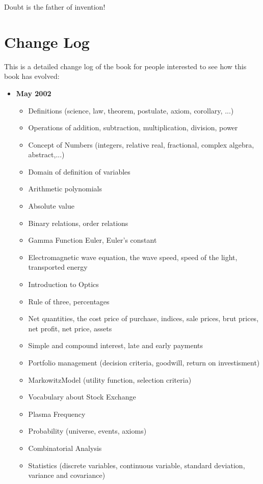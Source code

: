 \documentclass[12pt,a4paper,twoside,openright]{report}
\newcounter{def}
\theoremstyle{definition}
\theoremstyle{itexmp}
\numberwithin{equation}{section}
\begin{document}
 	\begin{fquote}Doubt is the father of invention!
 	\end{fquote}

\chapter{Change Log}

This is a detailed change log of the book for people interested to see how this book has evolved:

	\begin{itemize}
		\item \textbf{May 2002}
		\begin{itemize}[noitemsep]
			\item Definitions (science, law, theorem, postulate, axiom, corollary, ...)
			\item Operations of addition, subtraction, multiplication, division, power
			\item Concept of Numbers (integers, relative real, fractional, complex algebra, abstract,...)
			\item Domain of definition of variables
			\item Arithmetic polynomials
			\item Absolute value
			\item Binary relations, order relations
			\item Gamma Function Euler, Euler's constant
			\item Electromagnetic wave equation, the wave speed, speed of the light, transported energy
			\item Introduction to Optics
			\item Rule of three, percentages
			\item Net quantities, the cost price of purchase, indices, sale prices, brut prices, net profit, net price, assets
			\item Simple and compound interest, late and early payments
			\item Portfolio management (decision criteria, goodwill, return on investisment)
			\item MarkowitzModel  (utility function, selection criteria)
			\item Vocabulary about Stock Exchange
			\item Plasma Frequency
			\item Probability (universe, events, axioms)
			\item Combinatorial Analysis
			\item Statistics (discrete variables, continuous variable, standard deviation, variance and covariance)

\end{itemize}
\end{itemize}
\end{document}
